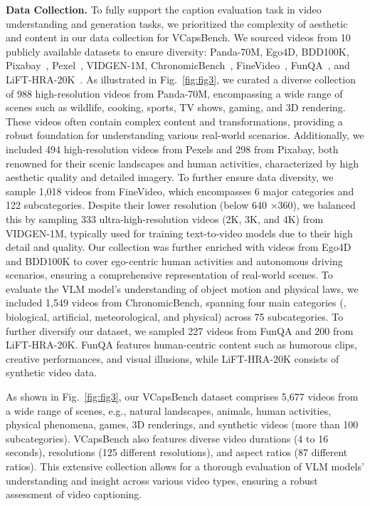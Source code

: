 \textbf{Data Collection.} To fully support the caption evaluation task in video understanding and generation tasks, we prioritized  the complexity of aesthetic and content in our data collection for VCapsBench. We sourced videos from 10 publicly available datasets to ensure diversity: Panda-70M\cite{ChenSMDCJF0RYT24}, Ego4D\cite{grauman2022ego4d}, BDD100K\cite{yu2020bdd100k}, Pixabay~\cite{chensharegpt4video}, Pexel~\cite{chensharegpt4video}, VIDGEN-1M\cite{tan2024vidgen}, ChronomicBench~\cite{yuan2024chronomagic}, FineVideo~\cite{Farre2024FineVideo}, FunQA~\cite{yuan2024chronomagic}, and LiFT-HRA-20K~\cite{wang2024lift}. As illustrated in Fig.~\ref{fig:fig3}, we curated a diverse collection of 988 high-resolution videos from Panda-70M\cite{ChenSMDCJF0RYT24}, encompassing a wide range of scenes such as wildlife, cooking, sports, TV shows, gaming, and 3D rendering. These videos often contain complex content and transformations, providing a robust foundation for understanding various real-world scenarios. Additionally, we included 494 high-resolution videos from Pexels and 298 from Pixabay, both renowned for their scenic landscapes and human activities, characterized by high aesthetic quality and detailed imagery. To further ensure data diversity, we sample 1,018 videos from FineVideo\cite{Farre2024FineVideo}, which encompasses 6 major categories and 122 subcategories. Despite their lower resolution (below 640 $ \times $360), we balanced this by sampling 333 ultra-high-resolution videos (2K, 3K, and 4K) from VIDGEN-1M\cite{tan2024vidgen}, typically used for training text-to-video models due to their high detail and quality. Our collection was further enriched with videos from Ego4D\cite{grauman2022ego4d} and BDD100K\cite{yu2020bdd100k} to cover ego-centric human activities and autonomous driving scenarios, ensuring a comprehensive representation of real-world scenes.
To evaluate the VLM model's understanding of object motion and physical laws, we included 1,549 videos from ChronomicBench, spanning four main categories
(\eg, biological, artificial, meteorological, and physical) across 75 subcategories. To further diversify our dataset, we sampled 227 videos from FunQA and 200 from LiFT-HRA-20K. FunQA features human-centric content such as humorous clips, creative performances, and visual illusions, while LiFT-HRA-20K consists of synthetic video data.


As shown in Fig.~\ref{fig:fig3}, our VCapsBench dataset comprises 5,677 videos from a wide range of scenes, e.g., natural landscapes, animals, human activities, physical phenomena, games, 3D renderings, and synthetic videos (more than 100 subcategories). VCapsBench also features diverse video durations (4 to 16 seconds), resolutions (125 different resolutions), and aspect ratios (87 different ratios). This extensive collection allows for a thorough evaluation of VLM models' understanding and insight across various video types, ensuring a robust assessment of video captioning.

